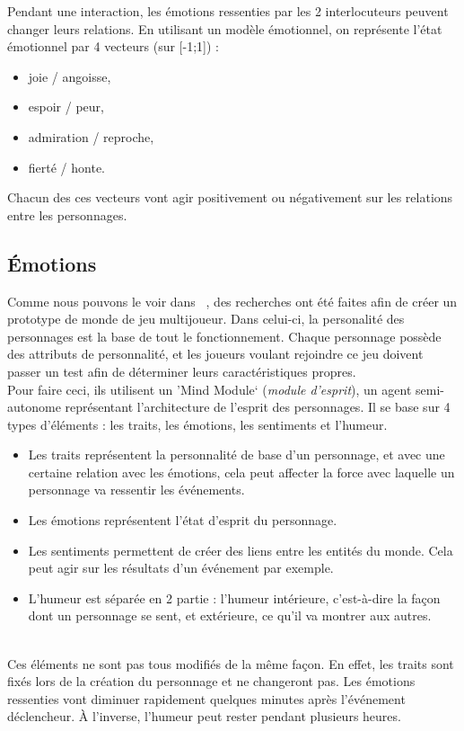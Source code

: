 \documentclass[asi]{picINSA}
\begin{document}
Pendant une interaction, les émotions ressenties par les 2 interlocuteurs peuvent changer leurs relations. En utilisant un modèle émotionnel, on représente l'état émotionnel par 4 vecteurs (sur [-1;1]) :
\begin{itemize}
\item joie / angoisse,
\item espoir / peur,
\item admiration / reproche,
\item fierté / honte.
\end{itemize}
Chacun des ces vecteurs vont agir positivement ou négativement sur les relations entre les personnages.

\subsection{Émotions}

Comme nous pouvons le voir dans ~\cite{IRIS:conf/aiide/Eladhari2010}, des recherches ont été faites afin de créer un prototype de monde de jeu multijoueur. Dans celui-ci, la personalité des personnages est la base de tout le fonctionnement. Chaque personnage possède des attributs de personnalité, et les joueurs voulant rejoindre ce jeu doivent passer un test afin de déterminer leurs caractéristiques propres.\\

Pour faire ceci, ils utilisent un \rq{}Mind Module\lq{} (\textit{module d'esprit}), un agent semi-autonome représentant l'architecture de l'esprit des personnages. Il se base sur 4 types d'éléments : les traits, les émotions, les sentiments et l'humeur.\\
\begin{itemize}
\item Les traits représentent la personnalité de base d'un personnage, et avec une certaine relation avec les émotions, cela peut affecter la force avec laquelle un personnage va ressentir les événements.
\item Les émotions représentent l'état d'esprit du personnage.
\item Les sentiments permettent de créer des liens entre les entités du monde. Cela peut agir sur les résultats d'un événement par exemple.
\item L'humeur est séparée en 2 partie : l'humeur intérieure, c'est-à-dire la façon dont un personnage se sent, et extérieure, ce qu'il va montrer aux autres.
\end{itemize}
~\\
Ces éléments ne sont pas tous modifiés de la même façon. En effet, les traits sont fixés lors de la création du personnage et ne changeront pas. Les émotions ressenties vont diminuer rapidement quelques minutes après l'événement déclencheur. À l'inverse, l'humeur peut rester pendant plusieurs heures.
\end{document}
